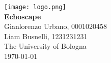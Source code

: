 \documentclass[11pt,                                          %
               a4paper,                                       %
               openright,                                     %
               twoside]{report}                               %
\newcommand{\theTitle}{Echoscape}            %
\newcommand{\theAuthor}{Gianlorenzo Urbano, 0001020458}                  %
\newcommand{\theAuthorL}{Liam Busnelli, 1231231231}
\begin{document}

\begin{titlepage}                                             %
\pagestyle{empty}                                             %
\centering                                                    %
\texttt{[image: logo.png]} \\ %
\vspace{60mm}                                                  %
{\LARGE \textbf{\textcolor{zinc}{\theTitle}}} \\ 
\vspace{2mm}%
{\large \theAuthor} \\ \vspace{2mm}       
{\large \theAuthorL} \\ \vspace{2mm} 
\vfill                                                        %
{\small The University of Bologna \\ \today}                %
\cleardoublepage                                              %
\end{titlepage}
\end{document}
